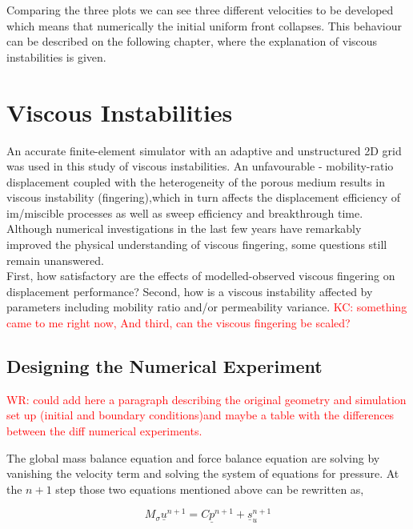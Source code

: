 \documentclass[preprint,authoryear,12pt]{elsarticle}
\begin{document}
Comparing the three plots we can see three different velocities to be developed which means that numerically the initial uniform front collapses. This behaviour can be described on the following chapter, where the explanation of viscous instabilities is given.         
  

\section{Viscous Instabilities}\label{section:ViscousInstabilities}

An accurate finite-element simulator with an adaptive and unstructured 2D grid was used in this study of viscous 
instabilities. An unfavourable - mobility-ratio displacement coupled with the heterogeneity of the porous medium results in viscous instability (fingering),which in turn affects the displacement efficiency of im/miscible processes as well as sweep efficiency and breakthrough time. Although numerical investigations 
in the last few years have remarkably improved the physical 
understanding of viscous fingering, some questions still remain 
unanswered.\\
 
First, how satisfactory are the effects of modelled-observed viscous fingering on displacement performance? Second, how 
is a viscous instability affected by parameters including mobility 
ratio and/or permeability variance. \textcolor{red}{ KC: something came to me right now, And third, can the viscous fingering be scaled?}  

\subsection{Designing the Numerical Experiment}\label{section:NumericalExperiment}
\textcolor{red}{WR: could add here a paragraph describing the original geometry and simulation set up (initial and boundary conditions)and maybe a table with the differences between the diff numerical experiments.}

The global mass balance equation and force balance equation are solving by vanishing the velocity term and solving the system of equations for pressure. At the $n+1$ step those two equations mentioned above can be rewritten as, 

\begin{equation}
M_{\sigma} {{\underline{u}}^{n+1}} = C {\underline{p}^{n+1}} + {\underline{s}_u ^{n+1}}
\label{mass balance eq}
\end{equation}
\end{document}
